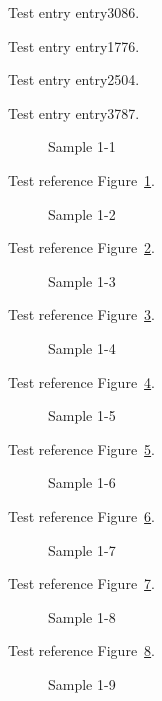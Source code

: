 Test entry \gls{entry3086}.

Test entry \gls{entry1776}.

Test entry \gls{entry2504}.

Test entry \gls{entry3787}.

\begin{figure}[tbhp]
\caption{Sample 1-1}
\label{fig:sample-1-1}
\end{figure}

Test reference Figure~\ref{fig:sample-1-1}.

\begin{figure}[tbhp]
\caption{Sample 1-2}
\label{fig:sample-1-2}
\end{figure}

Test reference Figure~\ref{fig:sample-1-2}.

\begin{figure}[tbhp]
\caption{Sample 1-3}
\label{fig:sample-1-3}
\end{figure}

Test reference Figure~\ref{fig:sample-1-3}.

\begin{figure}[tbhp]
\caption{Sample 1-4}
\label{fig:sample-1-4}
\end{figure}

Test reference Figure~\ref{fig:sample-1-4}.

\begin{figure}[tbhp]
\caption{Sample 1-5}
\label{fig:sample-1-5}
\end{figure}

Test reference Figure~\ref{fig:sample-1-5}.

\begin{figure}[tbhp]
\caption{Sample 1-6}
\label{fig:sample-1-6}
\end{figure}

Test reference Figure~\ref{fig:sample-1-6}.

\begin{figure}[tbhp]
\caption{Sample 1-7}
\label{fig:sample-1-7}
\end{figure}

Test reference Figure~\ref{fig:sample-1-7}.

\begin{figure}[tbhp]
\caption{Sample 1-8}
\label{fig:sample-1-8}
\end{figure}

Test reference Figure~\ref{fig:sample-1-8}.

\begin{figure}[tbhp]
\caption{Sample 1-9}
\label{fig:sample-1-9}
\end{figure}

